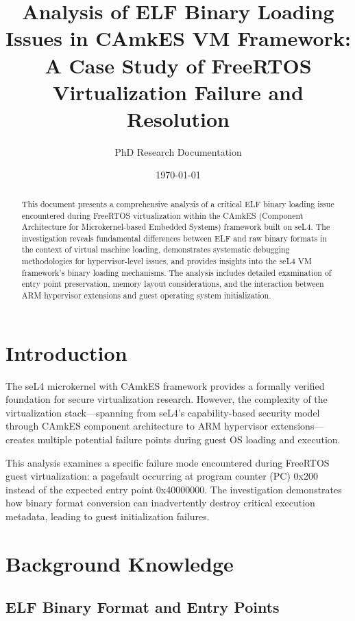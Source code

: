 \documentclass[11pt,a4paper]{article}
\title{Analysis of ELF Binary Loading Issues in CAmkES VM Framework: \\
A Case Study of FreeRTOS Virtualization Failure and Resolution}
\author{PhD Research Documentation}
\date{\today}
\begin{document}
\maketitle

\begin{abstract}
This document presents a comprehensive analysis of a critical ELF binary loading issue encountered during FreeRTOS virtualization within the CAmkES (Component Architecture for Microkernel-based Embedded Systems) framework built on seL4. The investigation reveals fundamental differences between ELF and raw binary formats in the context of virtual machine loading, demonstrates systematic debugging methodologies for hypervisor-level issues, and provides insights into the seL4 VM framework's binary loading mechanisms. The analysis includes detailed examination of entry point preservation, memory layout considerations, and the interaction between ARM hypervisor extensions and guest operating system initialization.
\end{abstract}

\tableofcontents
\newpage

\section{Introduction}

The seL4 microkernel with CAmkES framework provides a formally verified foundation for secure virtualization research. However, the complexity of the virtualization stack—spanning from seL4's capability-based security model through CAmkES component architecture to ARM hypervisor extensions—creates multiple potential failure points during guest OS loading and execution.

This analysis examines a specific failure mode encountered during FreeRTOS guest virtualization: a pagefault occurring at program counter (PC) 0x200 instead of the expected entry point 0x40000000. The investigation demonstrates how binary format conversion can inadvertently destroy critical execution metadata, leading to guest initialization failures.

\section{Background Knowledge}

\subsection{ELF Binary Format and Entry Points}
\end{document}
